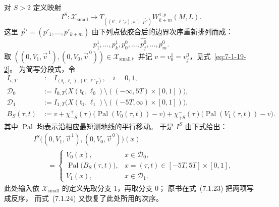 对 $S>2$ 定义映射
\[
I^S\colon\mathcal X_{\mathrm{small}}\longrightarrow
T_{((\mathfrak t',\ell'_T),w'_T,\vec p')}
W_{k+m}^{1,p}(M,L).
\]
这里 $\vec p'=(p'_1,\ldots,p'_{k+m})$
由下列点依胶合后的边界次序重新排列而成：
\[
p_1^1,\ldots,p_k^1,
p_0^0,\ldots,\widehat{p_j^0},\ldots,p_m^0.
\]
取
$((0,V_1,\vec v^{\,1}),(0,V_0,\vec v^{\,0}))
\in\mathcal X_{\mathrm{small}}$，并记
$v=v_0^1=v_j^0$，见式~\eqref{eq:7-1-19-2}。
为简写分段式，令
\[
\begin{aligned}
I_{i,T}&:=I_{(\mathfrak t_i,\ell_i),(\mathfrak t',\ell'_T)},
\quad i=0,1,\\
\mathcal D_0&:=I_{0,T}\bigl(X(\mathfrak t_0,\ell_0)
\setminus(( -\infty,5T)\times[0,1])\bigr),\\
\mathcal D_1&:=I_{1,T}\bigl(X(\mathfrak t_1,\ell_1)
\setminus((-5T,\infty)\times[0,1])\bigr),\\
B_S(\tau,t)&:=v+\chi^+_{-S}(\tau)
 \bigl(\operatorname{Pal}(V_0(\tau,t))-v\bigr)
 +\chi^-_{+S}(\tau)
 \bigl(\operatorname{Pal}(V_1(\tau,t))-v\bigr).
\end{aligned}
\]
其中 $\operatorname{Pal}$ 均表示沿相应最短测地线的平行移动。
于是 $I^S$ 由下式给出：
\begin{equation}
\begin{aligned}
&I^S\bigl((0,V_1,\vec v^{\,1}),(0,V_0,\vec v^{\,0})\bigr)(x)\\
&\qquad=
\begin{cases}
V_0(x),&x\in\mathcal D_0,\\
\operatorname{Pal}\bigl(B_S(\tau,t)\bigr),
 &x=(\tau,t)\in[-5T,5T]\times[0,1],\\
V_1(x),&x\in\mathcal D_1.
\end{cases}
\end{aligned}
\tag{7.1.23}\label{eq:7-1-23}
\end{equation}
此处输入依 $\mathcal X_{\mathrm{small}}$
的定义先取分支 $1$，再取分支 $0$；
原书在式~(7.1.23) 把两项写成反序，
而式~(7.1.24) 又恢复了此处所用的次序。

